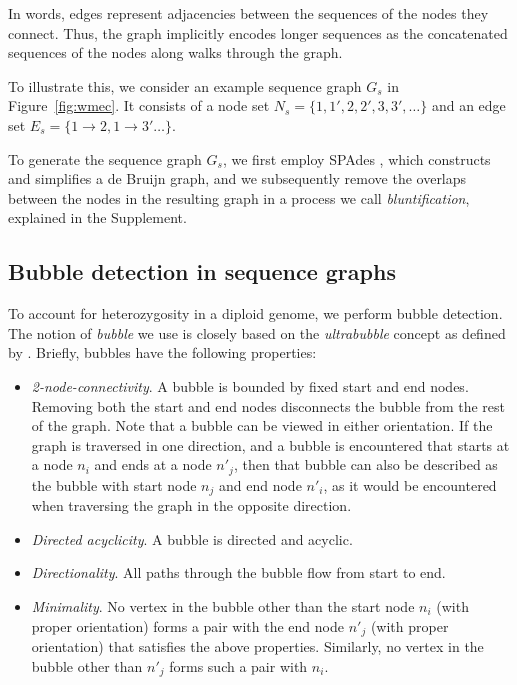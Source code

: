 In words, edges represent adjacencies between the sequences of the nodes they connect.
Thus, the graph implicitly encodes longer sequences as the concatenated sequences of the nodes along walks through the graph.

To illustrate this, we consider an example sequence graph $G_s$ in Figure~\ref{fig:wmec}. It consists of a node set $N_s = \{1, 1', 2, 2', 3, 3', \ldots\}$
and an edge set $E_s = \{1 \rightarrow 2, 1 \rightarrow 3' \ldots\}$.

To generate the sequence graph $G_s$, we first employ SPAdes \citep{bankevich2012spades}, which constructs and simplifies a de Bruijn graph, and we subsequently remove the overlaps between the nodes in the resulting graph in a process we call \textit{bluntification}, explained in the Supplement.

\subsection{Bubble detection in sequence graphs} To account for heterozygosity in a diploid genome, we perform bubble detection. The notion of \textit{bubble} we use is closely based on the \textit{ultrabubble} concept as defined by \cite{paten2017superbubbles}. Briefly, bubbles have the following properties:
\begin{itemize}
 \item \textit{2-node-connectivity}. A bubble is bounded by fixed start and end nodes.
 Removing both the start and end nodes disconnects the bubble from the rest of the graph.
 Note that a bubble can be viewed in either orientation.
 If the graph is traversed in one direction, and a bubble is encountered that starts at a node $n_i$  and ends at a node $n'_j$, then that bubble can also be described as the bubble with start node $n_j$ and end node $n'_i$, as it would be encountered when traversing the graph in the opposite direction.
  \item \textit{Directed acyclicity}. A bubble is directed and acyclic.
 \item \textit{Directionality}. All paths through the bubble flow from start to end.
 \item \textit{Minimality}. No vertex in the bubble other than the start node $n_i$ (with proper orientation) forms a pair with the end node $n'_j$ (with proper orientation) that satisfies the above properties. Similarly, no vertex in the bubble other than $n'_j$ forms such a pair with $n_i$.
\end{itemize}

